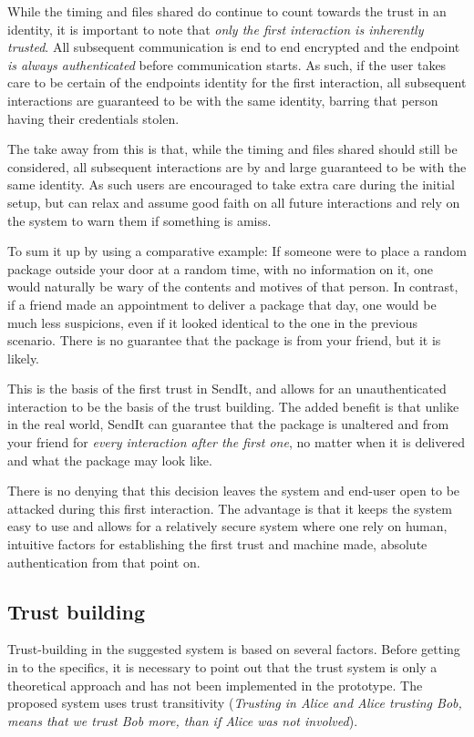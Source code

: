 		While the timing and files shared do continue to count towards the trust in an identity, it is important to note that \emph{only the first interaction is inherently trusted}. All subsequent communication is end to end encrypted and the endpoint \emph{is always authenticated} before communication starts. As such, if the user takes care to be certain of the endpoints identity for the first interaction, all subsequent interactions are guaranteed to be with the same identity, barring that person having their credentials stolen.

		The take away from this is that, while the timing and files shared should still be considered, all subsequent interactions are by and large guaranteed to be with the same identity. As such users are encouraged to take extra care during the initial setup, but can relax and assume good faith on all future interactions and rely on the system to warn them if something is amiss.

		To sum it up by using a comparative example: If someone were to place a random package outside your door at a random time, with no information on it, one would naturally be wary of the contents and motives of that person. In contrast, if a friend made an appointment to deliver a package that day, one would be much less suspicions, even if it looked identical to the one in the previous scenario. There is no guarantee that the package is from your friend, but it is likely.

		This is the basis of the first trust in SendIt, and allows for an unauthenticated interaction to be the basis of the trust building.  The added benefit is that unlike in the real world, SendIt can guarantee that the package is unaltered and from your friend for \emph{every interaction after the first one}, no matter when it is delivered and what the package may look like.

		There is no denying that this decision leaves the system and end-user open to be attacked during this first interaction. The advantage is that it keeps the system easy to use and allows for a relatively secure system where one rely on human, intuitive factors for establishing the first trust and machine made, absolute authentication from that point on.

	\subsection{Trust building}
		Trust-building in the suggested system is based on several factors. Before getting in to the specifics, it is necessary to point out that the trust system is only a theoretical approach and has not been implemented in the prototype. The proposed system uses trust transitivity \cite{lcns_semantic} (\emph{Trusting in Alice and Alice trusting Bob, means that we trust Bob more, than if Alice was not involved}).

